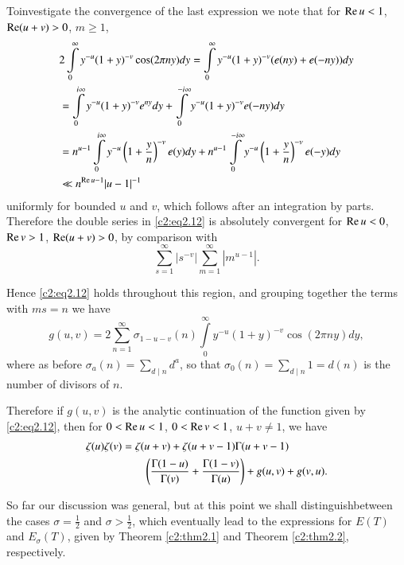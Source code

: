 To\pageoriginale investigate the convergence of the last expression we
note that for $\operatorname{Re} u < 1$, $\operatorname{Re} (u+v)> 0$, $m \geq 1$,
\begin{align}
   & 2 \int\limits^\infty_0 y^{-u} (1+y)^{-v} \cos (2 \pi n y) dy =
  \int\limits_0^\infty y^{-u} (1+y)^{-v} (e (ny) + e (- ny))dy\label{c2:eq2.13}\\
  & = \int\limits^{i \infty}_0 y^{-u} (1+ y)^{-v} e^{ny}dy +
  \int\limits^{- i \infty}_0 y^{-u} (1+y)^{-v} e (-ny)
  dy \notag\\
  & = n^{u-1} \int\limits^{i \infty}_0 y^{-u} \left(1+ \frac{y}{n} \right)^{-v}
  e(y) dy + n^{u-1} \int\limits^{- i \infty}_0 y^{-u} \left(1+
  \frac{y}{n}\right)^{-v} e(-y) dy\notag\\
  & \ll n^{\operatorname{Re} u-1}|u-1|^{-1}\notag
\end{align}
uniformly for bounded $u$ and $v$, which follows after an integration
by parts. Therefore the double series in \eqref{c2:eq2.12} is
absolutely convergent for $\operatorname{Re} u < 0$, $\operatorname{Re} v > 1$, $\operatorname{Re} (u+v)> 0$, by
comparison with 
$$
\sum_{s=1}^\infty |s^{-v}| \sum_{m=1}^\infty |m^{u-1}|.
$$

Hence \eqref{c2:eq2.12} holds throughout this region, and grouping
together the terms with $ms=n$ we have
$$
g(u, v) = 2 \sum_{n=1}^\infty \sigma_{1- u-v} (n) \int\limits^\infty_0
y^{-u} (1+y)^{-v} \cos (2 \pi n y) dy,
$$
where as before $\sigma_a (n) = \sum\limits_{d\mid n} d^a$, so that $\sigma_0
(n)= \sum\limits_{d \mid n} 1= d(n)$ is the number of divisors of $n$.

Therefore if $g(u, v)$ is the analytic continuation of the function
given by \eqref{c2:eq2.12}, then for $0 < \operatorname{Re} u < 1$, $0 < \operatorname{Re} v < 1$,
$u+v \neq 1$, we have
\begin{align}
  \zeta (u) \zeta (v)&= \zeta (u+v) + \zeta (u+v -1)\Gamma (u + v-1)\notag \\
  &\qquad\left( \frac{\Gamma
    (1-u)}{\Gamma (v)} + \frac{\Gamma (1-v)}{\Gamma
    (u)}\right) + g (u, v) + g(v, u).\label{c2:eq2.14}
\end{align}

So far our discussion was general, but at this point we shall
distinguish\pageoriginale between the cases $\sigma = \frac{1}{2}$ and
$\sigma > \frac{1}{2}$, which eventually lead to the expressions for
$E(T)$ and $E_\sigma(T)$, given by Theorem \ref{c2:thm2.1} and Theorem
\ref{c2:thm2.2}, respectively.

\medskip
{}

